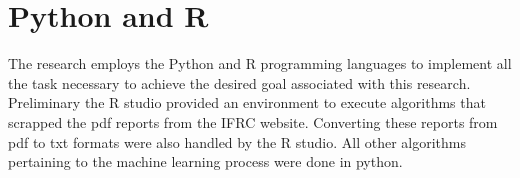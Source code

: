 \section{Python and R}
The research employs the Python and R programming languages to implement all the task necessary to achieve the desired goal associated with this research. Preliminary the R studio provided an environment to execute algorithms that scrapped the pdf reports from the IFRC website. Converting these reports from pdf to txt formats were also handled by the R studio. 
All other algorithms pertaining to the machine learning process were done in python.
%
%
%
%
%
%
%
%
%
%
%
%
